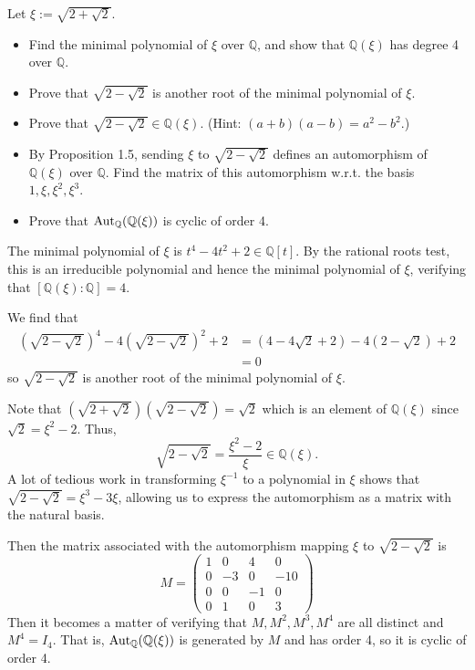 \documentclass[../../master.tex]{subfiles}
\begin{document}
\begin{problem}
    Let $\xi := \sqrt{2 + \sqrt{2}}$.
    \begin{itemize}
        \item Find the minimal polynomial of $\xi$ over $\mathbb{Q}$, and show that $\mathbb{Q}(\xi)$ has degree 4 over $\mathbb{Q}$.
        \item Prove that $\sqrt{2 - \sqrt{2}}$ is another root of the minimal polynomial of $\xi$.
        \item Prove that $\sqrt{2 - \sqrt{2}} \in \mathbb{Q}(\xi)$.
            (Hint: $(a + b)(a - b) = a^2 - b^2$.)
        \item By Proposition 1.5, sending $\xi$ to $\sqrt{2 - \sqrt{2}}$ defines an automorphism of $\mathbb{Q}(\xi)$ over $\mathbb{Q}$.
            Find the matrix of this automorphism w.r.t. the basis $1, \xi, \xi^2, \xi^3$.
        \item Prove that $\operatorname{Aut}_{\mathbb{Q}}(\mathbb{Q}(\xi))$ is cyclic of order 4.
    \end{itemize}
\end{problem}

\begin{solution}
    The minimal polynomial of $\xi$ is $t^{4} - 4t^2 + 2 \in \mathbb{Q}[t]$.
    By the rational roots test, this is an irreducible polynomial and hence the minimal polynomial of $\xi$, verifying that $[\mathbb{Q}(\xi) : \mathbb{Q}] = 4$.

    We find that
    \begin{align*}
        \left(\sqrt{2 - \sqrt{2}}\right)^{4} - 4\left(\sqrt{2 - \sqrt{2}}\right)^2 + 2 &= (4 - 4\sqrt{2} + 2) - 4(2 - \sqrt{2}) + 2 \\
                                                                 &= 0 
    \end{align*}
    so $\sqrt{2 - \sqrt{2}}$ is another root of the minimal polynomial of $\xi$.

    Note that $(\sqrt{2 + \sqrt{2}})(\sqrt{2 - \sqrt{2}}) = \sqrt{2}$ which is an element of $\mathbb{Q}(\xi)$ since $\sqrt{2} = \xi^2 - 2$.
    Thus,
    \[
        \sqrt{2 - \sqrt{2}} = \frac{\xi^2 - 2}{\xi} \in \mathbb{Q}(\xi).
    \]
    A lot of tedious work in transforming $\xi^{-1}$ to a polynomial in $\xi$ shows that $\sqrt{2 - \sqrt{2}} = \xi^3 - 3\xi$, allowing us to express the automorphism as a matrix with the natural basis.
    
    Then the matrix associated with the automorphism mapping $\xi$ to $\sqrt{2 - \sqrt{2}}$ is
    \[
    M =
    \begin{pmatrix}
        1 & 0 & 4 & 0 \\
        0 & -3 & 0 & -10 \\
        0 & 0 & -1 & 0 \\
        0 & 1 & 0 & 3
    \end{pmatrix}
    \]
    Then it becomes a matter of verifying that $M, M^2, M^3, M^{4}$ are all distinct and $M^{4} = I_4$.
    That is, $\operatorname{Aut}_{\mathbb{Q}}(\mathbb{Q}(\xi))$ is generated by $M$ and has order 4, so it is cyclic of order 4.
\end{solution}
\end{document}
